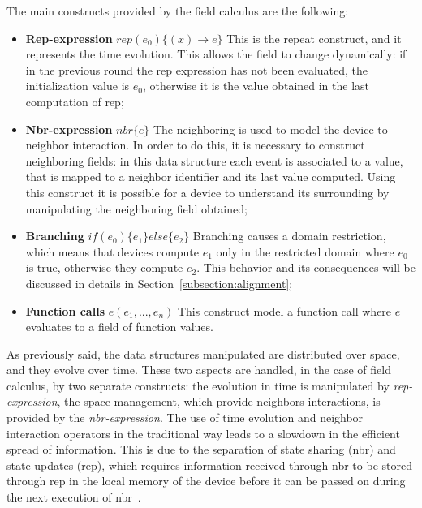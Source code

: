 The main constructs provided by the field calculus are the following:
\begin{itemize}
    \item \textbf{Rep-expression} $rep(e_0)\{(x) \rightarrow e\}$\newline
    This is the repeat construct, and it represents the time evolution. This allows the field to change dynamically: if in the previous round the rep expression has not been evaluated, the initialization value is $e_0$, otherwise it is the value obtained in the last computation of rep;
    \item \textbf{Nbr-expression} $nbr\{e\}$\newline
    The neighboring is used to model the device-to-neighbor interaction. In order to do this, it is necessary to construct neighboring fields: in this data structure each event is associated to a value, that is mapped to a neighbor identifier and its last value computed. Using this construct it is possible for a device to understand its surrounding by manipulating the neighboring field obtained;
    \item \textbf{Branching} $if(e_0)\{e_1\} else \{e_2\}$\newline
    Branching causes a domain restriction, which means that devices compute $e_1$ only in the restricted domain where $e_0$ is true, otherwise they compute $e_2$. This behavior and its consequences will be discussed in details in Section~\ref{subsection:alignment};
    \item \textbf{Function calls} $e(e_1, ..., e_n)$ \newline
    This construct model a function call where $e$ evaluates to a field of function values. 
\end{itemize}

As previously said, the data structures manipulated are distributed over space, and they evolve over time. These two aspects are handled, in the case of field calculus, by two separate constructs: the evolution in time is manipulated by \textit{rep-expression}, the space management, which provide neighbors interactions, is provided by the \textit{nbr-expression}.\newline
The use of time evolution and neighbor interaction operators in the traditional way leads to a slowdown in the efficient spread of information. This is due to the separation of state sharing (nbr) and state updates (rep), which requires information received through nbr to be stored through rep in the local memory of the device before it can be passed on during the next execution of nbr~\cite{share_operator}. 

